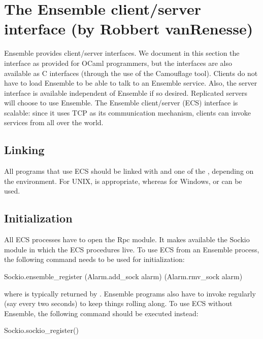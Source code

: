 %
%
%
\section{The Ensemble client/server interface (by Robbert vanRenesse)}

Ensemble provides client/server interfaces.  We document in this section the
interface as provided for OCaml programmers, but the interfaces are also available as
C interfaces (through the use of the Camouflage tool).  Clients do not have to load
Ensemble to be able to talk to an Ensemble service.  Also, the server interface is
available independent of Ensemble if so desired.  Replicated servers will choose to
use Ensemble.  The Ensemble client/server (ECS) interface is scalable: since it uses
TCP as its communication mechanism, clients can invoke services from all over the
world.

\subsection{Linking}

All programs that use ECS should be linked with  and one
of the , depending on the environment.  For UNIX,
 is appropriate, whereas for Windows,
 or  can be used.

\subsection{Initialization}

All ECS processes have to open the Rpc module.  It makes available the Sockio module
in which the ECS procedures live.  To use ECS from an Ensemble process, the following
command needs to be used for initialization:

\begin{codebox}
  Sockio.ensemble_register (Alarm.add_sock alarm) (Alarm.rmv_sock alarm)
\end{codebox}
where  is typically returned by .  Ensemble
programs also have to invoke  regularly (say every two seconds)
to keep things rolling along.  To use ECS without Ensemble, the following command
should be executed instead:
\begin{codebox}
  Sockio.sockio_register()
\end{codebox}

